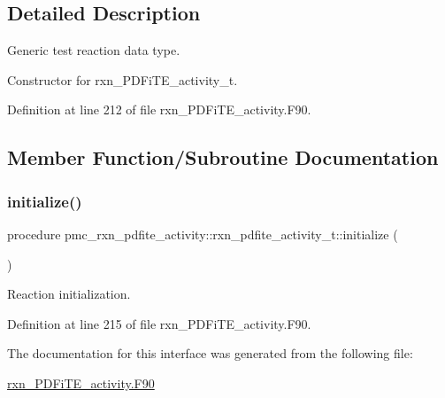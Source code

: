 \subsection{Detailed Description}
Generic test reaction data type. 

Constructor for rxn\+\_\+\+P\+D\+Fi\+T\+E\+\_\+activity\+\_\+t. 

Definition at line 212 of file rxn\+\_\+\+P\+D\+Fi\+T\+E\+\_\+activity.\+F90.



\subsection{Member Function/\+Subroutine Documentation}
\mbox{\label{structpmc__rxn__pdfite__activity_1_1rxn__pdfite__activity__t_a92d2989cacc3f2cdb22b8296bf069f9e}} 
\subsubsection{\texorpdfstring{initialize()}{initialize()}}
{\footnotesize\ttfamily procedure pmc\+\_\+rxn\+\_\+pdfite\+\_\+activity\+::rxn\+\_\+pdfite\+\_\+activity\+\_\+t\+::initialize (\begin{DoxyParamCaption}{ }\end{DoxyParamCaption})\hspace{0.3cm}{\ttfamily [private]}}



Reaction initialization. 



Definition at line 215 of file rxn\+\_\+\+P\+D\+Fi\+T\+E\+\_\+activity.\+F90.



The documentation for this interface was generated from the following file\+:\begin{DoxyCompactItemize}
\item 
\mbox{\hyperlink{rxn___p_d_fi_t_e__activity_8_f90}{rxn\+\_\+\+P\+D\+Fi\+T\+E\+\_\+activity.\+F90}}\end{DoxyCompactItemize}
